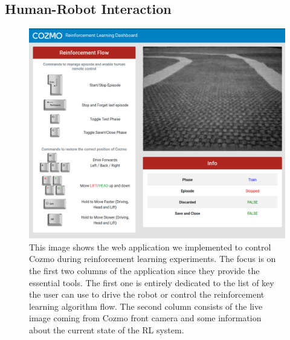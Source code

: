 \subsection{Human-Robot Interaction} \label{subsec:human-robot-interaction}

\begin{figure}

    \centering
    \includegraphics[width=\textwidth]{img/dashboard.png}
    \caption[Web Application implemented to Control Cozmo]{This image shows the web application we implemented to control Cozmo during reinforcement learning experiments. The focus is on the first two columns of the application since they provide the essential tools. The first one is entirely dedicated to the list of key the user can use to drive the robot or control the reinforcement learning algorithm flow. The second column consists of the live image coming from Cozmo front camera and some information about the current state of the RL system.}
    \label{fig:dashboard}
\end{figure}


